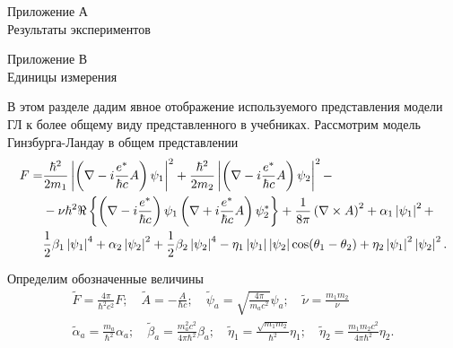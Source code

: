 \begin{center}
    Приложение А\\
    Результаты экспериментов
\end{center}
\newpage

\begin{center}
    Приложение В\\
    Единицы измерения
\end{center}

В этом разделе дадим явное отображение используемого представления модели ГЛ к 
более общему виду представленного в учебниках. Рассмотрим модель 
Гинзбурга-Ландау в общем представлении
\begin{align}
  F = & \frac{\hbar^2}{2m_1} \left| \left( \nabla - i\frac{e^*}{\hbar c} A\right)
    \psi_1 \right|^2 + \frac{\hbar^2}{2m_2} \left| \left( \nabla - i\frac{e^*}{\hbar c}A
    \right) \psi_2 \right|^2 - \nonumber \\
  & - \nu\hbar^2 \Re\left\{ \left( \nabla - i\frac{e^*}{\hbar c}
    \right)\psi_1 \left( \nabla + i\frac{e^*}{\hbar c}A \right)
    \psi^*_2\right\} + \frac{1}{8\pi}\left( \nabla\times A \right)^2 +
    \alpha_1\left| \psi_1 \right|^2 + \nonumber \\
  & \frac{1}{2}\beta_1\left| \psi_1 \right|^4 + \alpha_2\left| \psi_2 \right|^2 + \frac{1}{2}
    \beta_2\left| \psi_2 \right|^4 - \eta_1\left| \psi_1 \right|\left| \psi_2 \right|
    \cos(\theta_1 - \theta_2) + \eta_2\left| \psi_1 \right|^2\left| \psi_2 \right|^2.
    \label{eq:B-1}
\end{align}

Определим обозначенные величины
\begin{gather}
  \tilde{F} = \frac{4\pi}{\hbar^2 c^2}F; \quad
    \tilde{A} = -\frac{A}{\hbar c}; \quad
    \tilde{\psi}_a = \sqrt{\frac{4\pi}{m_a c^2}}\psi_a; \quad
    \tilde{\nu} = \frac{m_1m_2}\nu \nonumber \\
  \tilde{\alpha}_a = \frac{m_a}{\hbar^2}\alpha_a; \quad
    \tilde{\beta}_a = \frac{m^2_a c^2}{4\pi\hbar^2}\beta_a; \quad
    \tilde{\eta}_1 = \frac{\sqrt{m_1 m_2}}{\hbar^2}\eta_1; \quad
    \tilde{\eta}_2 = \frac{m_1 m_2 c^2}{4\pi\hbar^2}\eta_2. \label{eq:B-2}
\end{gather}

